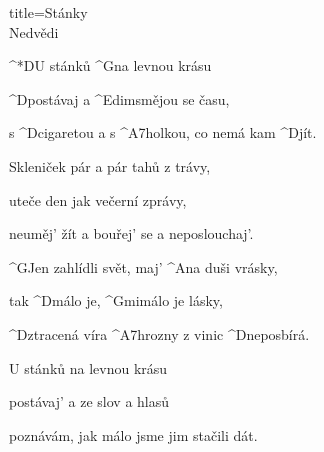 \begin{song}{title=\predtitle\centering Stánky \\\large Nedvědi \vspace*{-0.3cm}}  %
\begin{centerjustified}
\nejnejvetsi

\sloka
	^*{D}U\: stánků ^{G}na levnou krásu

	^{D\z}postávaj a ^{Edim\z}smějou se času,

	s ^{D\z}cigaretou a s ^{A7\z}holkou, co nemá kam ^{D}jít.

\sloka
	Skleniček pár a pár tahů z trávy,

	uteče den jak večerní zprávy,

	neuměj' žít a bouřej' se a neposlouchaj'.

	^{G}Jen zahlídli svět, maj' ^{A}na duši vrásky,

	tak ^{D\z}málo je, ^{Gmi}málo je lásky,

	^{D\z}ztracená víra ^{A7\z}hrozny z vinic ^{{\z}D}neposbírá.

\sloka
	U stánků na levnou krásu
   	
   	postávaj' a ze slov a hlasů
   	
   	poznávám, jak málo jsme jim stačili dát.




\end{centerjustified}
\setcounter{Slokočet}{0}
\end{song}
